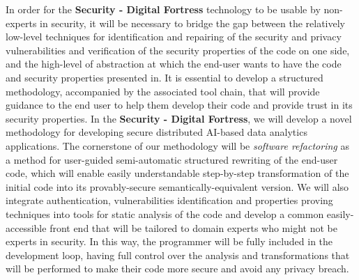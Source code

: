 \documentclass[a4paper,11pt]{article}
\newcommand{\project}[1]{\textbf{#1}\xspace}
\newcommand{\SECURITY}{\project{Security - Digital Fortress}}
\newcommand{\TheProject}{\SECURITY}
\begin{document}
In order for the \TheProject{} technology to be usable by non-experts in security, it will be necessary to bridge the gap between the relatively low-level techniques for identification and repairing of the security and privacy vulnerabilities and verification of the security properties of the code on one side, and the high-level of abstraction at which the end-user wants to have the code and security properties presented in. It is essential to develop a structured methodology, accompanied by the associated tool chain, that will provide guidance to the end user to help them develop their code and provide trust in its security properties. In the \TheProject{}, we will develop a novel methodology for developing secure distributed AI-based data analytics applications. The cornerstone of our methodology will be \emph{software refactoring} as a method for user-guided semi-automatic structured rewriting of the end-user code, which will enable easily understandable step-by-step transformation of the initial code into its provably-secure semantically-equivalent version. We will also integrate authentication, vulnerabilities identification and properties proving techniques into tools for static analysis of the code and develop a common easily-accessible front end that will be tailored to domain experts who might not be experts in security. In this way, the programmer will be fully included in the development loop, having full control over the analysis and transformations that will be performed to make their code more secure and avoid any privacy breach. 
\end{document}
